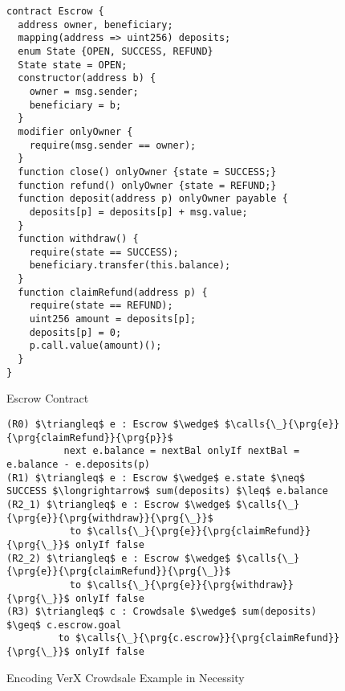 \begin{figure}[htb]
\begin{lstlisting}[language=chainmail]
contract Escrow {
  address owner, beneficiary;
  mapping(address => uint256) deposits;
  enum State {OPEN, SUCCESS, REFUND}
  State state = OPEN;
  constructor(address b) {
    owner = msg.sender;
    beneficiary = b;
  }
  modifier onlyOwner {
    require(msg.sender == owner);
  }
  function close() onlyOwner {state = SUCCESS;}
  function refund() onlyOwner {state = REFUND;}
  function deposit(address p) onlyOwner payable {
    deposits[p] = deposits[p] + msg.value;
  }
  function withdraw() {
    require(state == SUCCESS);
    beneficiary.transfer(this.balance);
  }
  function claimRefund(address p) {
    require(state == REFUND);
    uint256 amount = deposits[p];
    deposits[p] = 0;
    p.call.value(amount)();
  }
}
\end{lstlisting}
\caption{Escrow Contract}
\label{f:verx:escrow}
\end{figure}

\begin{figure}[htb]
\begin{lstlisting}[mathescape=true, language=chainmail]
(R0) $\triangleq$ e : Escrow $\wedge$ $\calls{\_}{\prg{e}}{\prg{claimRefund}}{\prg{p}}$
          next e.balance = nextBal onlyIf nextBal = e.balance - e.deposits(p)
(R1) $\triangleq$ e : Escrow $\wedge$ e.state $\neq$ SUCCESS $\longrightarrow$ sum(deposits) $\leq$ e.balance
(R2_1) $\triangleq$ e : Escrow $\wedge$ $\calls{\_}{\prg{e}}{\prg{withdraw}}{\prg{\_}}$
           to $\calls{\_}{\prg{e}}{\prg{claimRefund}}{\prg{\_}}$ onlyIf false
(R2_2) $\triangleq$ e : Escrow $\wedge$ $\calls{\_}{\prg{e}}{\prg{claimRefund}}{\prg{\_}}$
           to $\calls{\_}{\prg{e}}{\prg{withdraw}}{\prg{\_}}$ onlyIf false
(R3) $\triangleq$ c : Crowdsale $\wedge$ sum(deposits) $\geq$ c.escrow.goal
         to $\calls{\_}{\prg{c.escrow}}{\prg{claimRefund}}{\prg{\_}}$ onlyIf false
\end{lstlisting}
\caption{Encoding VerX Crowdsale Example in Necessity}
\label{f:verx:encoding}
\end{figure}
